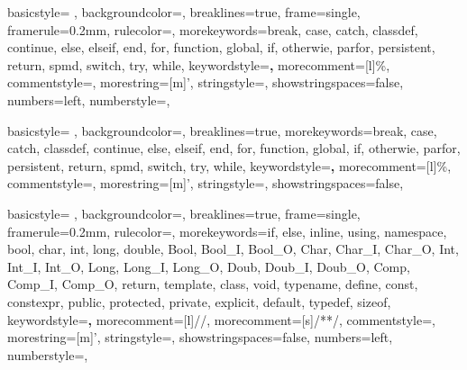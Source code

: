 {
    basicstyle= \ttfamily{}, %
    backgroundcolor=\color{background}, %
    breaklines=true, %
    frame=single,
    framerule=0.2mm, %
    rulecolor=\color{gray}, %
    morekeywords={break, case, catch, classdef, continue, else, elseif, end, for, function, global, if, otherwie, parfor, persistent, return, spmd, switch, try, while},
    keywordstyle=\color{blue}\textbf,
    morecomment=[l]{\%},
    commentstyle=\color{comment},
    morestring=[m]',
    stringstyle=\color{string},
    showstringspaces=false,
    numbers=left,
    numberstyle={\ttfamily{}\color{gray}}, %
}

{
    basicstyle= \ttfamily{}, %
    backgroundcolor=\color{background}, %
    breaklines=true, %
    morekeywords={break, case, catch, classdef, continue, else, elseif, end, for, function, global, if, otherwie, parfor, persistent, return, spmd, switch, try, while},
    keywordstyle=\color{blue}\textbf,
    morecomment=[l]{\%},
    commentstyle=\color{comment},
    morestring=[m]',
    stringstyle=\color{string},
    showstringspaces=false,
}

{
    basicstyle= \ttfamily{}, %
    backgroundcolor=\color{background}, %
    breaklines=true, %
    frame=single,
    framerule=0.2mm, %
    rulecolor=\color{gray}, %
    morekeywords={if, else, inline, using, namespace, bool, char, int, long, double, Bool, Bool_I, Bool_O, Char, Char_I, Char_O, Int, Int_I, Int_O, Long, Long_I, Long_O, Doub, Doub_I, Doub_O, Comp, Comp_I, Comp_O, return, template, class, void, typename, define, const, constexpr, public, protected, private, explicit, default, typedef, sizeof},
    keywordstyle=\color{blue}\textbf,
    morecomment=[l]{//},
    morecomment=[s]{/*}{*/},
    commentstyle=\color{comment},
    morestring=[m]',
    stringstyle=\color{string},
    showstringspaces=false,
    numbers=left,
    numberstyle={\ttfamily{}\color{gray}}, %
}
